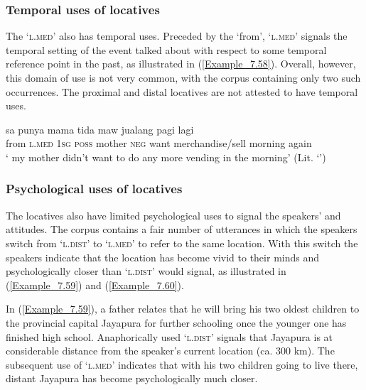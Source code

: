 {\subsubsection[Temporal uses of locatives]{Temporal uses of locatives}
\label{Para_7.2.2.3}
The   ‘\textsc{l.med}’ also has temporal uses. Preceded by the   ‘from’,  ‘\textsc{l.med}’ signals the temporal setting of the event talked about with respect to some temporal reference point in the past, as illustrated in (\ref{Example_7.58}). Overall, however, this domain of use is not very common, with the corpus containing only two such occurrences. The proximal and distal locatives are not attested to have temporal uses.

\ea
\label{Example_7.58}
 {{}} {sa} {punya} {mama} {tida} {maw} {jualang} {pagi} {lagi}\\ %
 from  {\textsc{l.med}}  \textsc{1sg}  \textsc{poss}  mother  \textsc{neg}  want  merchandise/sell  {morning} {again}\\
\glt ‘ my mother didn’t want to do any more vending in the morning’ (Lit. ‘’) \textstyleExampleSource{[081014-014-NP.0006]}
\z


\subsubsection[Psychological uses of locatives]{Psychological uses of locatives}
\label{Para_7.2.2.4}
The locatives also have limited psychological uses to signal the speakers’  and attitudes. The corpus contains a fair number of utterances in which the speakers switch from  ‘\textsc{l.dist}’ to  ‘\textsc{l.med}’ to refer to the same location. With this switch the speakers indicate that the location has become vivid to their minds and psychologically closer than  ‘\textsc{l.dist}’ would signal, as illustrated in (\ref{Example_7.59}) and (\ref{Example_7.60}).



In (\ref{Example_7.59}), a father relates that he will bring his two oldest children to the provincial capital Jayapura for further schooling once the younger one has finished high school. Anaphorically used  ‘\textsc{l.dist}’ signals that Jayapura is at considerable distance from the speaker’s current location (ca. 300 km). The subsequent use of  ‘\textsc{l.med}’ indicates that with his two children going to live there, distant Jayapura has become psychologically much closer.


}
